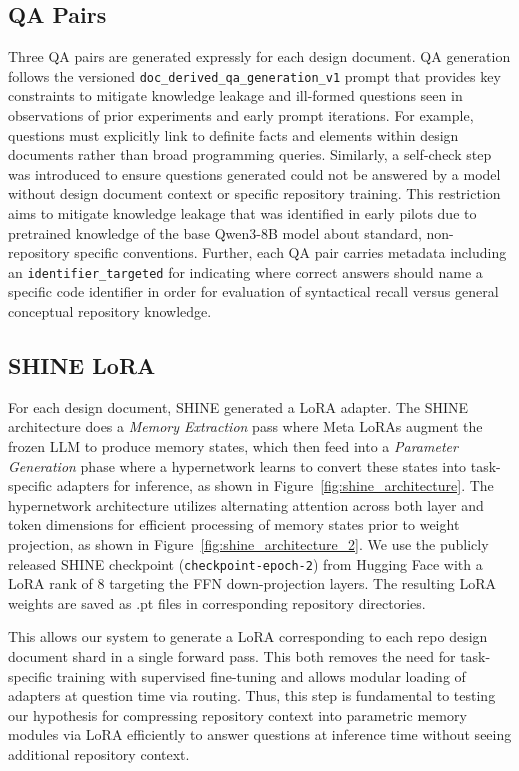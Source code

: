 \documentclass[conference,10.5pt]{IEEEtran}
\begin{document}
\subsection{QA Pairs}
Three QA pairs are generated expressly for each design document. QA generation follows the versioned \texttt{doc\_derived\_qa\_generation\_v1} prompt that provides key constraints to mitigate knowledge leakage and ill-formed questions seen in observations of prior experiments and early prompt iterations. For example, questions must explicitly link to definite facts and elements within design documents rather than broad programming queries. Similarly, a self-check step was introduced to ensure questions generated could not be answered by a model without design document context or specific repository training. This restriction aims to mitigate knowledge leakage that was identified in early pilots due to pretrained knowledge of the base Qwen3-8B model about standard, non-repository specific conventions. Further, each QA pair carries metadata including an \texttt{identifier\_targeted} for indicating where correct answers should name a specific code identifier in order for evaluation of syntactical recall versus general conceptual repository  knowledge.

\subsection{SHINE LoRA}
For each design document, SHINE generated a LoRA adapter. The SHINE architecture does a \textit{Memory Extraction} pass where Meta LoRAs augment the frozen LLM to produce memory states, which then feed into a \textit{Parameter Generation} phase where a hypernetwork learns to convert these states into task-specific adapters for inference, as shown in Figure~\ref{fig:shine_architecture}. The hypernetwork architecture utilizes alternating attention across both layer and token dimensions for efficient processing of memory states prior to weight projection, as shown in Figure~\ref{fig:shine_architecture_2}. We use the publicly released SHINE checkpoint (\texttt{checkpoint-epoch-2}) from Hugging Face with a LoRA rank of 8 targeting the FFN down-projection layers. The resulting LoRA weights are saved as .pt files in corresponding repository directories.


This allows our system to generate a LoRA corresponding to each repo design document shard in a single forward pass. This both removes the need for task-specific training with supervised fine-tuning and allows modular loading of adapters at question time via routing. Thus, this step is fundamental to testing our hypothesis for compressing repository context into parametric memory modules via LoRA efficiently to answer questions at inference time without seeing additional repository context.
\end{document}
